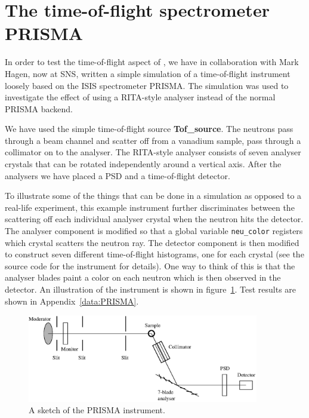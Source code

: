 \section{The time-of-flight spectrometer PRISMA}
\label{s:PRISMA}

In order to test the time-of-flight aspect of \MCS, we have
in collaboration with Mark Hagen, now at SNS, written a simple
simulation of a time-of-flight instrument loosely based on the ISIS
spectrometer PRISMA. The simulation was used to investigate the effect
of using a RITA-style analyser instead of the normal PRISMA backend.

We have used the simple time-of-flight source {\bf Tof\_source}.
The neutrons pass through a
beam channel and scatter off from a vanadium sample, pass through
a collimator on to the analyser.
The RITA-style analyser consists of seven analyser crystals
that can be rotated independently around a vertical axis. After the
analysers we have placed a PSD and a time-of-flight detector.

To illustrate some of the things that can be done in a simulation as
opposed to a real-life experiment, this example instrument further
discriminates between
the scattering off each individual analyser crystal
when the neutron hits the detector. The
analyser component is modified so that a global variable
\verb+neu_color+ registers which
crystal scatters the neutron ray. The detector component
is then modified to construct seven different time-of-flight histograms,
one for each crystal (see the source code for the instrument
for details). One way to think of this is that
the analyser blades paint a color on each neutron which is then
observed in the detector.
An illustration of the instrument is shown in figure~\ref{f:PRISMA}.
Test results are shown in Appendix~\ref{data:PRISMA}.

\begin{figure}[h]
  \begin{center}
    \includegraphics[width=0.9\textwidth]{figures/prisma2.eps}
  \end{center}
\caption{A sketch of the PRISMA instrument.}
\label{f:PRISMA}
\end{figure}

